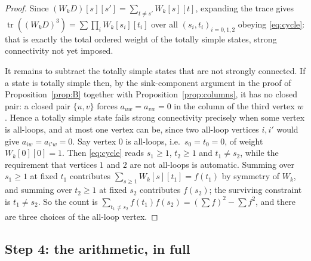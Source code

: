 \documentclass[11pt]{amsart}
\theoremstyle{remark}
\begin{document}
\begin{proof}
Since $(W_kD)[s][s']=\sum_{t\neq s'}W_k[s][t]$, expanding the trace gives
$\operatorname{tr}((W_kD)^3)=\sum\prod_{i}W_k[s_i][t_i]$ over all
$(s_i,t_i)_{i=0,1,2}$ obeying \eqref{eq:cycle}: that is exactly the total ordered weight of
the totally simple states, strong connectivity not yet imposed.

It remains to subtract the totally simple states that are not strongly connected.  If a
state is totally simple then, by the sink-component argument in the proof of
Proposition~\ref{prop:B} together with Proposition~\ref{prop:columns}, it has no closed
pair: a closed pair $\{u,v\}$ forces $a_{uw}=a_{vw}=0$ in the column of the third vertex
$w$.  Hence a totally simple state fails strong connectivity precisely when some vertex is
all-loops, and at most one vertex can be, since two all-loop vertices $i,i'$ would give
$a_{iw}=a_{i'w}=0$.  Say vertex $0$ is all-loops, i.e.\ $s_0=t_0=0$, of weight
$W_k[0][0]=1$.  Then \eqref{eq:cycle} reads $s_1\ge1$, $t_2\ge1$ and $t_1\neq s_2$, while
the requirement that vertices $1$ and $2$ are not all-loops is automatic.  Summing over
$s_1\ge1$ at fixed $t_1$ contributes $\sum_{s\ge1}W_k[s][t_1]=f(t_1)$ by symmetry of
$W_k$, and summing over $t_2\ge1$ at fixed $s_2$ contributes $f(s_2)$; the surviving
constraint is $t_1\neq s_2$.  So the count is
$\sum_{t_1\neq s_2}f(t_1)f(s_2)=(\sum f)^2-\sum f^2$, and there are three choices of the
all-loop vertex.
\end{proof}

\subsection*{Step 4: the arithmetic, in full}
\end{document}
